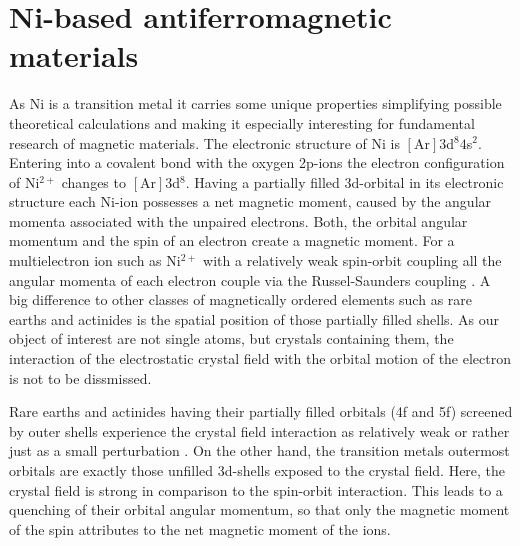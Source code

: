 \section{Ni-based antiferromagnetic materials}
As Ni is a transition metal it carries some unique properties simplifying possible theoretical calculations and making it especially interesting for fundamental research of magnetic materials.
The electronic structure of Ni is $[\text{Ar}]3$d$^8 4$s$^2$.
Entering into a covalent bond with the oxygen 2p-ions the electron configuration of Ni$^{2+}$ changes to $[\text{Ar}]3$d$^8$.
Having a partially filled 3d-orbital in its electronic structure each Ni-ion possesses a net magnetic moment, caused by the angular momenta associated with the unpaired electrons.
Both, the orbital angular momentum and the spin of an electron create a magnetic moment.
For a multielectron ion such as Ni$^{2+}$ with a relatively weak spin-orbit coupling all the angular momenta of each electron couple via the Russel-Saunders coupling .
A big difference to other classes of magnetically ordered elements such as rare earths and actinides is the spatial position of those partially filled shells.
As our object of interest are not single atoms, but crystals containing them, the interaction of the electrostatic crystal field with the orbital motion of the electron is not to be dissmissed.

Rare earths and actinides having their partially filled orbitals (4f and 5f) screened by outer shells experience the crystal field interaction as relatively weak or rather just as a small perturbation .
On the other hand, the transition metals outermost orbitals are exactly those unfilled 3d-shells exposed to the crystal field.
Here, the crystal field is strong in comparison to the spin-orbit interaction.
This leads to a quenching of their orbital angular momentum, so that only the magnetic moment of the spin attributes to the net magnetic moment of the ions.

